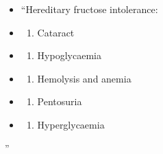 \documentclass[
]{book}
\providecommand{\tightlist}{%
  \setlength{\itemsep}{0pt}\setlength{\parskip}{0pt}}
\begin{document}
\begin{itemize}
\item
  ``Hereditary fructose intolerance:
\item
  \begin{enumerate}
  \def\labelenumi{(\Alph{enumi})}
  \tightlist
  \item
    Cataract\\
  \end{enumerate}
\item
  \begin{enumerate}
  \def\labelenumi{(\Alph{enumi})}
  \setcounter{enumi}{1}
  \tightlist
  \item
    Hypoglycaemia\\
  \end{enumerate}
\item
  \begin{enumerate}
  \def\labelenumi{(\Alph{enumi})}
  \setcounter{enumi}{2}
  \tightlist
  \item
    Hemolysis and anemia\\
  \end{enumerate}
\item
  \begin{enumerate}
  \def\labelenumi{(\Alph{enumi})}
  \setcounter{enumi}{3}
  \tightlist
  \item
    Pentosuria\\
  \end{enumerate}
\item
  \begin{enumerate}
  \def\labelenumi{(\Alph{enumi})}
  \setcounter{enumi}{4}
  \tightlist
  \item
    Hyperglycaemia
  \end{enumerate}
\end{itemize}

''
\end{document}
